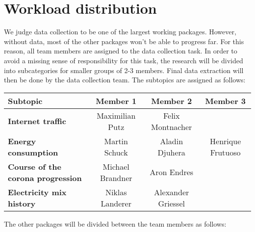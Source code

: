 \documentclass[s=english,inputenc=utf8,fontsize=10pt]{ldvarticle}
\begin{document}
\section{Workload distribution}

We judge data collection to be one of the largest working packages. However, without data, most of the other packages won't be able to progress far. For this reason, all team members are assigned to the data collection task. In order to avoid a missing sense of responsibility for this task, the research will be divided into subcategories for smaller groups of 2-3 members. Final data extraction will then be done by the data collection team.
The subtopics are assigned as follows:
\begin{table}[h]
	\begin{center}
		\begin{tabular}{l|ccc} %
			\textbf{Subtopic} & Member 1 & Member 2 & Member 3\\
			\hline
			\textbf{Internet traffic} & Maximilian Putz & Felix Montnacher &\\
			\textbf{Energy consumption} & Martin Schuck & Aladin Djuhera & Henrique Frutuoso\\
			\textbf{Course of the corona progression} & Michael Brandner & Aron Endres &\\
			\textbf{Electricity mix history} & Niklas Landerer & Alexander Griessel &\\
		\end{tabular}
	\end{center}
\end{table}

The other packages will be divided between the team members as follows:
\linebreak
   
\end{document}
